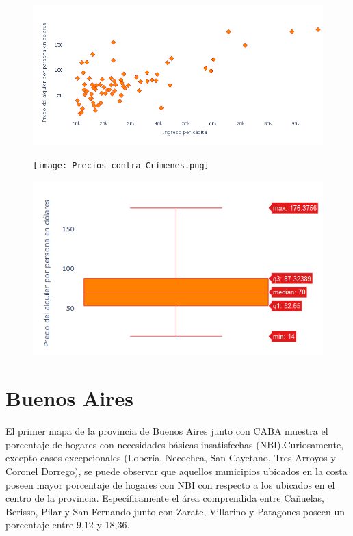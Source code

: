\documentclass{article}
\begin{document}
\begin{figure}[htbp]
\centerline{\includegraphics[scale=.75]{Precios contra Ingreso.png}}
\caption{}
\label{fig}
\end{figure}

\begin{figure}[htbp]
\centerline{\texttt{[image: Precios contra Crímenes.png]}}
\caption{}
\label{fig}
\end{figure}


\begin{figure}[htbp]
\centerline{\includegraphics[scale=1]{Box Plot de precios.png}}
\caption{}
\label{fig}
\end{figure}

\section{Buenos Aires}
El primer mapa de la provincia de Buenos Aires junto con CABA muestra el porcentaje de hogares con necesidades básicas insatisfechas (NBI).Curiosamente, excepto casos excepcionales (Lobería, Necochea, San Cayetano, Tres Arroyos y Coronel Dorrego), se puede observar que aquellos municipios ubicados en la costa poseen mayor porcentaje de hogares con NBI con respecto a los ubicados en el centro de la provincia. Específicamente el área comprendida entre Cañuelas, Berisso, Pilar y San Fernando junto con Zarate, Villarino y Patagones poseen un porcentaje entre 9,12 y 18,36.\\
\end{document}
